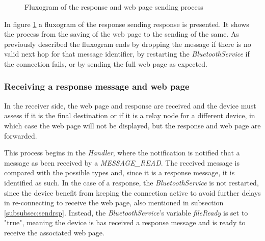 \begin{figure}[ht]
   \noindent{}
	\caption{\label{fig:rspsendflux} Fluxogram of the response and web page sending process}
\end{figure}

In figure \ref{fig:rspsendflux} a fluxogram of the response sending response is presented. It shows the process from the saving of the web page to the sending of the same. As previously described the fluxogram ends by dropping the message if there is no valid next hop for that message identifier, by restarting the \textit{BluetoothService} if the connection fails, or by sending the full web page as expected.

\subsubsection{Receiving a response message and web page}
\label{subsubsec:rcvrsp}

In the receiver side, the web page and response are received and the device must assess if it is the final destination or if it is a relay node for a different device, in which case the web page will not be displayed, but the response and web page are forwarded.

This process begins in the \textit{Handler}, where the notification is notified that a message as been received by a \textit{MESSAGE\_READ}. The received message is compared with the possible types and, since it is a response message, it is identified as such. In the case of a response, the \textit{BluetoothService} is not restarted, since the device benefit from keeping the connection active to avoid further delays in re-connecting to receive the web page, also mentioned in subsection \ref{subsubsec:sendrsp}. Instead, the \textit{BluetoothService}'s variable \textit{fileReady} is set to "true", meaning the device is has received a response message and is ready to receive the associated web page.

